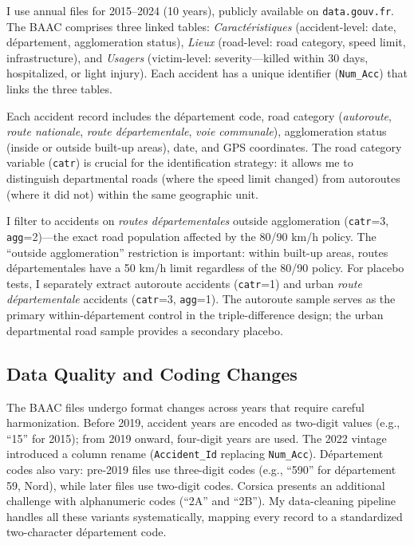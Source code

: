 \documentclass[12pt]{article}
\begin{document}
I use annual files for 2015--2024 (10 years), publicly available on \texttt{data.gouv.fr}. The BAAC comprises three linked tables: \textit{Caract\'{e}ristiques} (accident-level: date, d\'{e}partement, agglomeration status), \textit{Lieux} (road-level: road category, speed limit, infrastructure), and \textit{Usagers} (victim-level: severity---killed within 30 days, hospitalized, or light injury). Each accident has a unique identifier (\texttt{Num\_Acc}) that links the three tables.

Each accident record includes the d\'{e}partement code, road category (\textit{autoroute}, \textit{route nationale}, \textit{route d\'{e}partementale}, \textit{voie communale}), agglomeration status (inside or outside built-up areas), date, and GPS coordinates. The road category variable (\texttt{catr}) is crucial for the identification strategy: it allows me to distinguish departmental roads (where the speed limit changed) from autoroutes (where it did not) within the same geographic unit.

I filter to accidents on \textit{routes d\'{e}partementales} outside agglomeration (\texttt{catr}=3, \texttt{agg}=2)---the exact road population affected by the 80/90 km/h policy. The ``outside agglomeration'' restriction is important: within built-up areas, routes d\'{e}partementales have a 50 km/h limit regardless of the 80/90 policy. For placebo tests, I separately extract autoroute accidents (\texttt{catr}=1) and urban \textit{route d\'{e}partementale} accidents (\texttt{catr}=3, \texttt{agg}=1). The autoroute sample serves as the primary within-d\'{e}partement control in the triple-difference design; the urban departmental road sample provides a secondary placebo.

\subsection{Data Quality and Coding Changes}

The BAAC files undergo format changes across years that require careful harmonization. Before 2019, accident years are encoded as two-digit values (e.g., ``15'' for 2015); from 2019 onward, four-digit years are used. The 2022 vintage introduced a column rename (\texttt{Accident\_Id} replacing \texttt{Num\_Acc}). D\'{e}partement codes also vary: pre-2019 files use three-digit codes (e.g., ``590'' for d\'{e}partement 59, Nord), while later files use two-digit codes. Corsica presents an additional challenge with alphanumeric codes (``2A'' and ``2B''). My data-cleaning pipeline handles all these variants systematically, mapping every record to a standardized two-character d\'{e}partement code.
\end{document}
